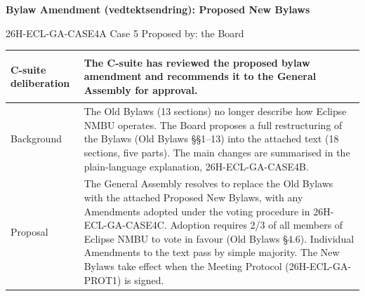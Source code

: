 \documentclass{../../../Common/Latex/Templates/rapport}
\begin{document}
\reportmainmatter
\begingroup
\small
\setlength{\parindent}{0pt}
\setlength{\tabcolsep}{6pt}
\renewcommand{\arraystretch}{1.2}

\begin{center}
  {\Large\bfseries Bylaw Amendment (vedtektsendring): Proposed New Bylaws}\par
  \vspace{0.15cm}
  {\normalsize 26H-ECL-GA-CASE4A \textperiodcentered{} Case 5 \textperiodcentered{} Proposed by: the Board}\par
  \vspace{0.1cm}
  {\small \meetingline}\par
\end{center}

\vspace{0.3cm}
\begin{tabularx}{\textwidth}{|>{\bfseries\raggedright\arraybackslash}p{4.2cm}|X|}
  \hline
  C-suite deliberation & The C-suite has reviewed the proposed bylaw amendment and recommends it to the General Assembly for approval.                                                                                                                                                                                                                                                                                                                                                                                                                                                                                                                                                            \\
  \hline
  Background           & The Old Bylaws (13 sections) no longer describe how Eclipse NMBU operates. The Board proposes a full restructuring of the Bylaws (Old Bylaws \S\S1--13) into the attached text (18 sections, five parts). The main changes are summarised in the plain-language explanation, 26H-ECL-GA-CASE4B.                                                                                                                                                                                                                                                                                                                                                                          \\
  \hline
  Proposal             & The General Assembly resolves to replace the Old Bylaws with the attached Proposed New Bylaws, with any Amendments adopted under the voting procedure in 26H-ECL-GA-CASE4C. Adoption requires 2/3 of all members of Eclipse NMBU to vote in favour (Old Bylaws \S4.6). Individual Amendments to the text pass by simple majority. The New Bylaws take effect when the Meeting Protocol (26H-ECL-GA-PROT1) is signed.                                                                                                                                                                                                                                                     \\

\end{tabularx}
\end{document}
